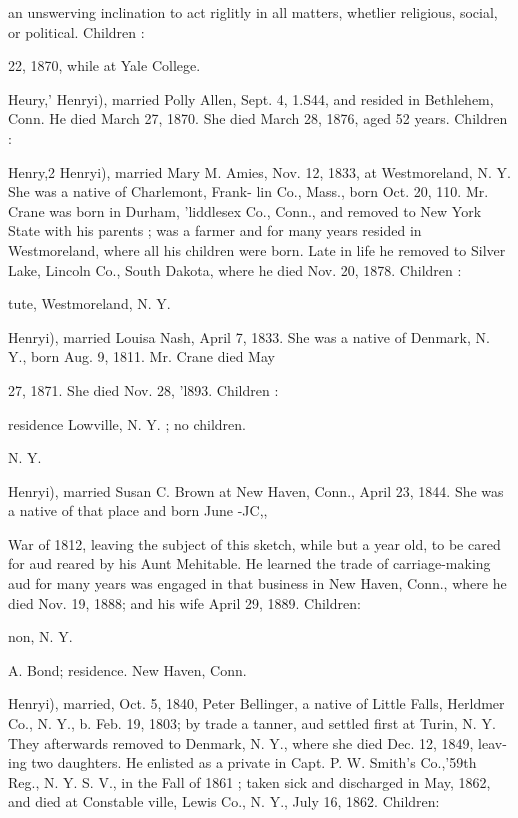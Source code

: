 \documentclass{book}
\begin{document}
an unswerving inclination to act riglitly in all matters, whetlier 
religious, social, or political. Children : 



22, 1870, while at Yale College. 

Heury,' Henryi), married Polly Allen, Sept. 4, 1.S44, and resided 
in Bethlehem, Conn. He died March 27, 1870. She died March 
28, 1876, aged 52 years. Children : 


Henry,2 Henryi), married Mary M. Amies, Nov. 12, 1833, at 
Westmoreland, N. Y. She was a native of Charlemont, Frank- 
lin Co., Mass., born Oct. 20, 110. Mr. Crane was born in 
Durham, 'liddlesex Co., Conn., and removed to New York State 
with his parents ; was a farmer and for many years resided in 
Westmoreland, where all his children were born. Late in life he 
removed to Silver Lake, Lincoln Co., South Dakota, where he 
died Nov. 20, 1878. Children : 


tute, Westmoreland, N. Y. 



Henryi), married Louisa Nash, April 7, 1833. She was a native 
of Denmark, N. Y., born Aug. 9, 1811. Mr. Crane died May 

27, 1871. She died Nov. 28, 'l893. Children : 




residence Lowville, N. Y. ; no children. 

N. Y. 

Henryi), married Susan C. Brown at New Haven, Conn., April 
23, 1844. She was a native of that place and born June -JC,, 




War of 1812, leaving the subject of this sketch, while but a year 
old, to be cared for aud reared by his Aunt Mehitable. He 
learned the trade of carriage-making aud for many years was 
engaged in that business in New Haven, Conn., where he died 
Nov. 19, 1888; and his wife April 29, 1889. Children: 

non, N. Y. 


A. Bond; residence. New Haven, Conn. 


Henryi), married, Oct. 5, 1840, Peter Bellinger, a native of 
Little Falls, Herldmer Co., N. Y., b. Feb. 19, 1803; by trade a 
tanner, aud settled first at Turin, N. Y. They afterwards 
removed to Denmark, N. Y., where she died Dec. 12, 1849, leav- 
ing two daughters. He enlisted as a private in Capt. P. W. 
Smith's Co.,'59th Reg., N. Y. S. V., in the Fall of 1861 ; taken 
sick and discharged in May, 1862, and died at Constable ville, 
Lewis Co., N. Y., July 16, 1862. Children: 
\end{document}
